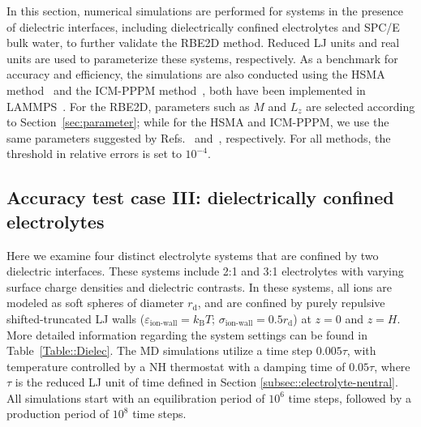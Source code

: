 In this section, numerical simulations are performed for systems in the presence of dielectric interfaces, including dielectrically confined electrolytes and SPC/E bulk water, to further validate the RBE2D method.  {Reduced LJ units and real units are used to parameterize these systems, respectively.}
As a benchmark for accuracy and efficiency, the simulations are also  conducted using the HSMA method~\cite{liang2020harmonic} and the ICM-PPPM method~\cite{yuan2021particle}, both have been implemented in LAMMPS~\cite{liang2022hsma}. 
For the RBE2D, parameters such as $M$ and $L_z$ are selected according to Section~\ref{sec:parameter}; while
for the HSMA and ICM-PPPM, we use the same parameters suggested by Refs.~\cite{liang2020harmonic} and~\cite{yuan2021particle}, respectively. For all methods, the threshold in  relative errors is set to $10^{-4}$.

\subsection{Accuracy test case III: dielectrically confined electrolytes}

Here we examine four distinct electrolyte systems that are confined by two dielectric interfaces.
These systems include 2:1 and 3:1 electrolytes with varying surface charge densities and dielectric contrasts.
In these systems, all ions are modeled as soft spheres of diameter $r_{\text{d}}$, and are confined by purely repulsive shifted-truncated LJ walls ($\varepsilon_{\text{ion-wall}}=k_{\text{B}}T$; $\sigma_{\text{ion-wall}}=0.5r_{\text{d}}$) at $z=0$ and $z=H$. More detailed information regarding the system settings can be found in Table~\ref{Table::Dielec}.
The MD simulations utilize a time step $0.005\tau$, with temperature controlled by a NH thermostat %
with a damping time of $0.05\tau$,  {where $\tau$ is the reduced LJ unit of time defined in Section \ref{subsec::electrolyte-neutral}}.
All simulations start with an equilibration period of $10^6$ time steps, followed by a production period of $10^8$ time steps.

